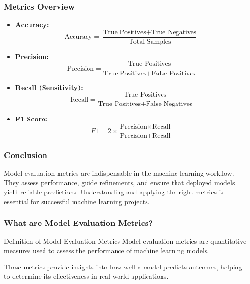 \documentclass{beamer}
\begin{document}
\begin{frame}[fragile]
    \frametitle{Metrics Overview}
    \begin{itemize}
        \item \textbf{Accuracy:} 
        \begin{equation}
        \text{Accuracy} = \frac{\text{True Positives} + \text{True Negatives}}{\text{Total Samples}}
        \end{equation}

        \item \textbf{Precision:} 
        \begin{equation}
        \text{Precision} = \frac{\text{True Positives}}{\text{True Positives} + \text{False Positives}}
        \end{equation}

        \item \textbf{Recall (Sensitivity):} 
        \begin{equation}
        \text{Recall} = \frac{\text{True Positives}}{\text{True Positives} + \text{False Negatives}}
        \end{equation}

        \item \textbf{F1 Score:} 
        \begin{equation}
        F1 = 2 \times \frac{\text{Precision} \times \text{Recall}}{\text{Precision} + \text{Recall}}
        \end{equation}
    \end{itemize}
\end{frame}

\begin{frame}[fragile]
    \frametitle{Conclusion}
    Model evaluation metrics are indispensable in the machine learning workflow. They assess performance, guide refinements, and ensure that deployed models yield reliable predictions. 
    Understanding and applying the right metrics is essential for successful machine learning projects.
\end{frame}

\begin{frame}[fragile]
    \frametitle{What are Model Evaluation Metrics?}
    \begin{block}{Definition of Model Evaluation Metrics}
        Model evaluation metrics are quantitative measures used to assess the performance of machine learning models. 
    \end{block}
    These metrics provide insights into how well a model predicts outcomes, helping to determine its effectiveness in real-world applications.
\end{frame}
\end{document}
